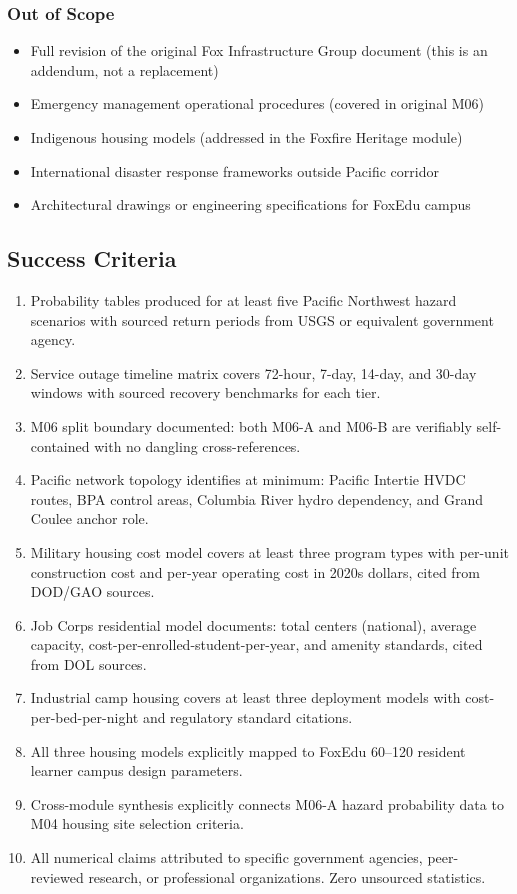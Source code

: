 \documentclass[11pt,letterpaper]{article}
\begin{document}
\subsubsection{Out of Scope}
\begin{itemize}[leftmargin=1.5em]
  \item Full revision of the original Fox Infrastructure Group document (this is an addendum, not a replacement)
  \item Emergency management operational procedures (covered in original M06)
  \item Indigenous housing models (addressed in the Foxfire Heritage module)
  \item International disaster response frameworks outside Pacific corridor
  \item Architectural drawings or engineering specifications for FoxEdu campus
\end{itemize}

\subsection{Success Criteria}

\begin{enumerate}[leftmargin=1.5em]
  \item Probability tables produced for at least five Pacific Northwest hazard scenarios with sourced return periods from USGS or equivalent government agency.
  \item Service outage timeline matrix covers 72-hour, 7-day, 14-day, and 30-day windows with sourced recovery benchmarks for each tier.
  \item M06 split boundary documented: both M06-A and M06-B are verifiably self-contained with no dangling cross-references.
  \item Pacific network topology identifies at minimum: Pacific Intertie HVDC routes, BPA control areas, Columbia River hydro dependency, and Grand Coulee anchor role.
  \item Military housing cost model covers at least three program types with per-unit construction cost and per-year operating cost in 2020s dollars, cited from DOD/GAO sources.
  \item Job Corps residential model documents: total centers (national), average capacity, cost-per-enrolled-student-per-year, and amenity standards, cited from DOL sources.
  \item Industrial camp housing covers at least three deployment models with cost-per-bed-per-night and regulatory standard citations.
  \item All three housing models explicitly mapped to FoxEdu 60--120 resident learner campus design parameters.
  \item Cross-module synthesis explicitly connects M06-A hazard probability data to M04 housing site selection criteria.
  \item All numerical claims attributed to specific government agencies, peer-reviewed research, or professional organizations. Zero unsourced statistics.
\end{enumerate}
\end{document}
